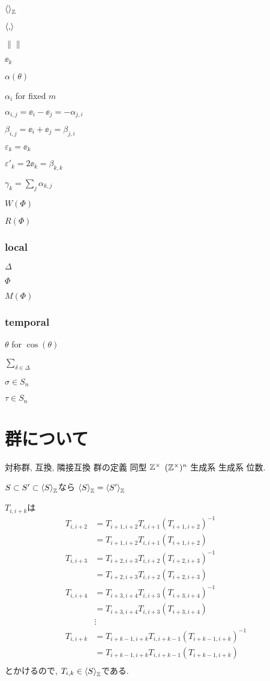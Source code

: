 $\Braket{}_{\mathbb{Z}}$

$\Braket{,}$

$\|\|$

$\ee_k$ 

$\alpha(\theta)$

$\alpha_i$ for fixed $m$

$\alpha_{i,j}=\ee_i-\ee_j=-\alpha_{j,i}$

$\beta_{i,j}=\ee_i+\ee_j=\beta_{j,i}$

$\varepsilon_k = \ee_k$

$\varepsilon'_k = 2\ee_k = \beta_{k,k}$

$\gamma_k=\sum_j\alpha_{k,j}$

$W(\Phi)$

$R(\Phi)$

\subsubsection{local}
$\Delta$

$\Phi$

$M(\Phi)$

\subsubsection{temporal}

$\theta$ for $\cos(\theta)$

$\sum_{\delta\in\Delta}$

$\sigma\in S_n$

$\tau\in S_n$

\section{群について}
対称群, 互換, 隣接互換
群の定義
同型
$\mathbb{Z}^{\times}$ $(\mathbb{Z}^{\times})^n$ 生成系
生成系
位数.

$S\subset S' \subset \Braket{S}_{\mathbb{Z}}$なら
$\Braket{S}_{\mathbb{Z}}=\Braket{S'}_{\mathbb{Z}}$


$T_{i,i+k}$は
\begin{align*}
  T_{i,i+2}
  &=T_{i+1,i+2}T_{i,i+1}(T_{i+1,i+2})^{-1}\\
  &=T_{i+1,i+2}T_{i,i+1}(T_{i+1,i+2})\\
  T_{i,i+3}
  &=T_{i+2,i+3}T_{i,i+2}(T_{i+2,i+3})^{-1}\\
  &=T_{i+2,i+3}T_{i,i+2}(T_{i+2,i+3})\\
  T_{i,i+4}
  &=T_{i+3,i+4}T_{i,i+3}(T_{i+3,i+4})^{-1}\\
  &=T_{i+3,i+4}T_{i,i+3}(T_{i+3,i+4})\\
  &\vdots\\
  T_{i,i+k}
  &=T_{i+k-1,i+k}T_{i,i+k-1}(T_{i+k-1,i+k})^{-1}\\
  &=T_{i+k-1,i+k}T_{i,i+k-1}(T_{i+k-1,i+k})\\
\end{align*}
とかけるので, 
$T_{i,k}\in\Braket{S}_{\mathbb{Z}}$である.
